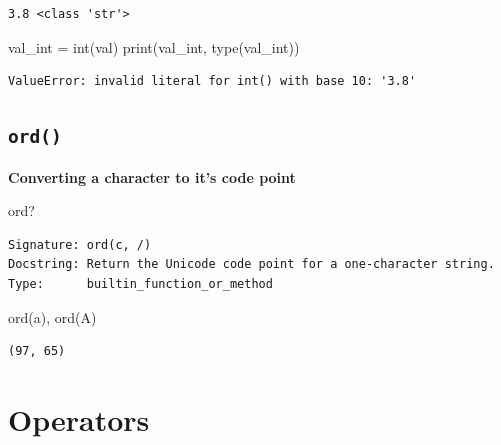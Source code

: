 \documentclass[
  letterpaper,
  DIV=11,
  numbers=noendperiod]{scrreprt}
\newenvironment{Shaded}{\begin{snugshade}}{\end{snugshade}}
\newcommand{\BuiltInTok}[1]{\textcolor[rgb]{0.00,0.23,0.31}{#1}}
\newcommand{\NormalTok}[1]{\textcolor[rgb]{0.00,0.23,0.31}{#1}}
\newcommand{\OperatorTok}[1]{\textcolor[rgb]{0.37,0.37,0.37}{#1}}
\newcommand{\StringTok}[1]{\textcolor[rgb]{0.13,0.47,0.30}{#1}}
\begin{document}
\begin{verbatim}
3.8 <class 'str'>
\end{verbatim}

\begin{Shaded}
\begin{Highlighting}[]
\NormalTok{val\_int }\OperatorTok{=} \BuiltInTok{int}\NormalTok{(val)}
\BuiltInTok{print}\NormalTok{(val\_int, }\BuiltInTok{type}\NormalTok{(val\_int))}
\end{Highlighting}
\end{Shaded}

\begin{verbatim}
ValueError: invalid literal for int() with base 10: '3.8'
\end{verbatim}

\hypertarget{ord}{%
\section{\texorpdfstring{\texttt{ord()}}{ord()}}\label{ord}}

\textbf{Converting a character to it's code point}

\begin{Shaded}
\begin{Highlighting}[]
\BuiltInTok{ord}\NormalTok{?}
\end{Highlighting}
\end{Shaded}

\begin{verbatim}
Signature: ord(c, /)
Docstring: Return the Unicode code point for a one-character string.
Type:      builtin_function_or_method
\end{verbatim}

\begin{Shaded}
\begin{Highlighting}[]
\BuiltInTok{ord}\NormalTok{(}\StringTok{\textquotesingle{}a\textquotesingle{}}\NormalTok{), }\BuiltInTok{ord}\NormalTok{(}\StringTok{\textquotesingle{}A\textquotesingle{}}\NormalTok{)}
\end{Highlighting}
\end{Shaded}

\begin{verbatim}
(97, 65)
\end{verbatim}

\hypertarget{operators}{%
\chapter{Operators}\label{operators}}
\end{document}

